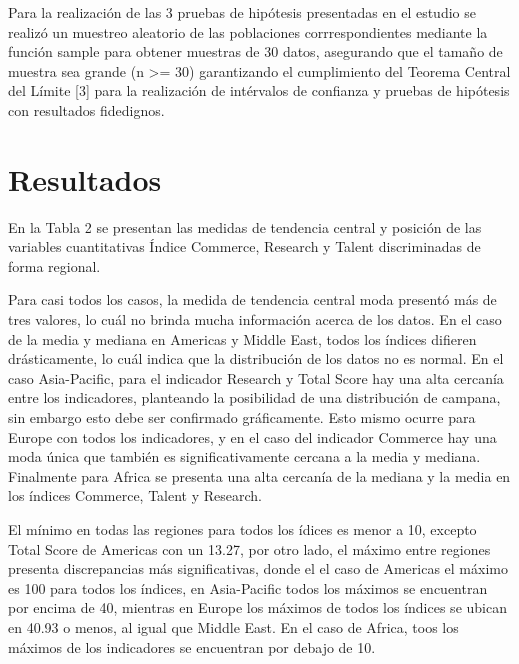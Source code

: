 \documentclass[
]{article}
\begin{document}
\begin{multicols}{2}
Para la realización de las 3 pruebas de hipótesis presentadas en el estudio se realizó un muestreo aleatorio de las poblaciones corrrespondientes mediante la función sample para obtener muestras de 30 datos, asegurando que el tamaño de muestra sea grande (n >= 30) garantizando el cumplimiento del Teorema Central del Límite [3] para la realización de intérvalos de confianza y pruebas de hipótesis con resultados fidedignos.







\section{Resultados}
En la Tabla 2 se presentan las medidas de tendencia central y posición de las variables cuantitativas Índice Commerce, Research y Talent discriminadas de forma regional. 

Para casi todos los casos, la medida de tendencia central moda presentó más de tres valores, lo cuál no brinda mucha información acerca de los datos. En el caso de la media y mediana en Americas y Middle East, todos los índices difieren drásticamente, lo cuál indica que la distribución de los datos no es normal. En el caso Asia-Pacific, para el indicador Research y Total Score hay una alta cercanía entre los indicadores, planteando la posibilidad de una distribución de campana, sin embargo esto debe ser confirmado gráficamente. Esto mismo ocurre para Europe con todos los indicadores, y en el caso del indicador Commerce hay una moda única que también es significativamente cercana a la media y mediana. Finalmente para Africa se presenta una alta cercanía de la mediana y la media en los índices Commerce, Talent y Research.

El mínimo en todas las regiones para todos los ídices es menor a 10, excepto Total Score de Americas con un 13.27, por otro lado, el máximo entre regiones presenta discrepancias más significativas, donde el el caso de Americas el máximo es 100 para todos los índices, en Asia-Pacific todos los máximos se encuentran por encima de 40, mientras en Europe los máximos de todos los índices se ubican en 40.93 o menos, al igual que Middle East. En el caso de Africa, toos los máximos de los indicadores se encuentran por debajo de 10.

\end{multicols}
\end{document}
